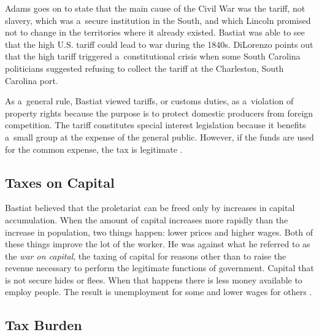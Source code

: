 Adams 
\parencite[][pp.332–333]{adams_for_1993} %
 goes on to state that the main cause of the Civil War was the tariff, not slavery, which was a~secure institution in the South, and which Lincoln promised not to change in the territories where it already existed. Bastiat 
\parencite*[][p.462]{bastiat_economic_1964-1} %
 was able to see that the high U.S. tariff could lead to war during the 1840s. DiLorenzo 
\parencite*[][p.63]{dilorenzo_real_2002} %
 points out that the high tariff triggered a~constitutional crisis when some South Carolina politicians suggested refusing to collect the tariff at the Charleston, South Carolina port.



As a~general rule, Bastiat viewed tariffs, or customs duties, as a~violation of property rights because the purpose is to protect domestic producers from foreign competition. The tariff constitutes special interest legislation because it benefits a~small group at the expense of the general public. However, if the funds are used for the common expense, the tax is legitimate 
\parencite[][pp.111–112]{bastiat_selected_1964}.%




\subsection{Taxes on Capital }



Bastiat believed that the proletariat can be freed only by increases in capital accumulation. When the amount of capital increases more rapidly than the increase in population, two things happen: lower prices and higher wages. Both of these things improve the lot of the worker. He was against what he referred to as the \textit{war on capital}, the taxing of capital for reasons other than to raise the revenue necessary to perform the legitimate functions of government. Capital that is not secure hides or flees. When that happens there is less money available to employ people. The result is unemployment for some and lower wages for others 
\parencite[][pp.184–185]{bastiat_selected_1964}.%




\subsection{Tax Burden }



